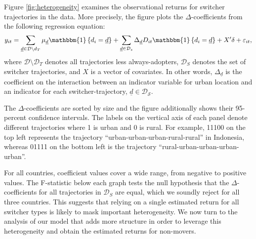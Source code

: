 \documentclass[12pt]{article}
\begin{document}
Figure \ref{fig:heterogeneity} examines the observational returns for switcher trajectories in the data. 
More precisely, the figure plots the $\Delta$-coefficients from the following regression equation: 
\begin{equation}
    y_{i t} = \sum_{\underline{d} \in \mathcal{D} \setminus d_{T}} \mu_{\underline{d}} \mathbbm{1} \left\{d_{i}=\underline{d} \right\} + \sum_{\underline{d} \in \mathcal{D}_{s}} \Delta_{\underline{d}} D_{i t} \mathbbm{1} \left\{d_{i}=\underline{d} \right\} + X'\delta +\varepsilon_{i t}, 
\end{equation}
\noindent where $\mathcal{D} \setminus \mathcal{D}_{T}$ denotes all trajectories less always-adopters, $\mathcal{D}_{S}$ denotes the set of switcher trajectories, and $X$ is a vector of covariates. 
In other words, $\Delta_{\underline{d}}$ is the coefficient on the interaction between an indicator variable for urban location and an indicator for each switcher-trajectory, $\underline{d} \in \mathcal{D_{S}}$.

The $\Delta$-coefficients are sorted by size and the figure additionally shows their 95-percent confidence intervals. The labels on the vertical axis of each panel denote different trajectories where 1 is urban and 0 is rural. For example, 11100 on the top left represents the trajectory ``urban-urban-urban-rural-rural'' in Indonesia, whereas 01111 on the bottom left is the trajectory ``rural-urban-urban-urban-urban''. 

For all countries, coefficient values cover a wide range, from negative to positive values. 
The F-statistic below each graph tests the null hypothesis that the $\Delta$-coefficients for all trajectories in $\mathcal{D}_{S}$ are equal, which we soundly reject for all three countries. 
This suggests that relying on a single estimated return for all switcher types is likely to mask important heterogeneity.
We now turn to the analysis of our model that adds more structure in order to leverage this heterogeneity and obtain the estimated returns for non-movers.
\end{document}
